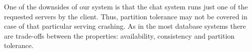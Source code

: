 One of the downsides of our system is that the chat system runs just one of the requested servers by the client. Thus, partition tolerance may not be covered in case of that particular serving crashing. As in the most database systems there are trade-offs between the properties: availability, consistency and partition tolerance.

    



